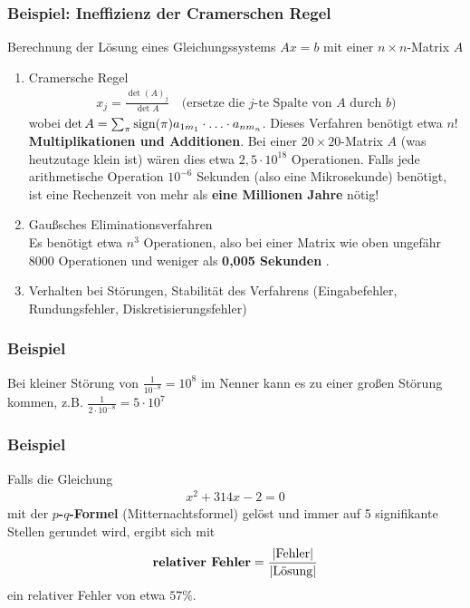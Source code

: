 \subsubsection{Beispiel: Ineffizienz der Cramerschen Regel}\label{CramerscheRegel}
Berechnung der Lösung eines Gleichungssystems 
$ A x=b$ mit einer $n \times n$-Matrix $A$
\begin{enumerate}
\item Cramersche Regel
  \begin{gather*} 
    x_j = \frac{\det  (A)_j}{\det A} 
    \quad\text{(ersetze die $j$-te  Spalte von $A$ durch $b$)}
  \end{gather*}
  wobei $\det A = \sum_{\pi} \operatorname{sign}(\pi) a_{1 m_1} \cdot \ldots \cdot a_{n
    m_n}$.
  Dieses Verfahren benötigt etwa \textbf{$n!$ Multiplikationen und Additionen}.
  Bei einer $20 \times 20$-Matrix $A$ (was  heutzutage klein ist)
  wären dies etwa $2,5\cdot 10^{18}$
  Operationen. Falls jede arithmetische Operation $10^{-6}$ Sekunden 
  (also eine Mikrosekunde) benötigt, ist eine Rechenzeit
  von mehr als \textbf{eine Millionen Jahre} nötig!
\item Gaußsches Eliminationsverfahren\\
  Es benötigt etwa $n^3$ Operationen, also bei einer Matrix wie oben
  ungefähr 8000 Operationen und weniger als \textbf{0,005 Sekunden}
  \cite[siehe auch][]{golubortega}.
\item Verhalten bei Störungen, Stabilität des Verfahrens
  (Eingabefehler, Rundungsfehler, Diskretisierungsfehler)\\
\end{enumerate}

\subsubsection{Beispiel}
Bei kleiner Störung von $\frac{1}{10^{-8}} = 10^8$ im Nenner
kann es zu einer großen Störung kommen, z.B.
$\frac{1}{2\cdot 10^{-8}}=5\cdot 10^7$

\subsubsection{Beispiel}
Falls die Gleichung
\begin{gather*}
  x^2 + 314 x - 2 = 0
\end{gather*}
mit der \textbf{$p$-$q$-Formel} (Mitternachtsformel)
gelöst und immer auf 5 signifikante Stellen gerundet wird,
ergibt sich mit
\begin{gather*}
  \text{\textbf{relativer Fehler}}
  =\frac{\left|\text{Fehler}\right|}
  {\left|\text{Lösung}\right|}
\end{gather*}
ein relativer Fehler von etwa $57 \%$.

